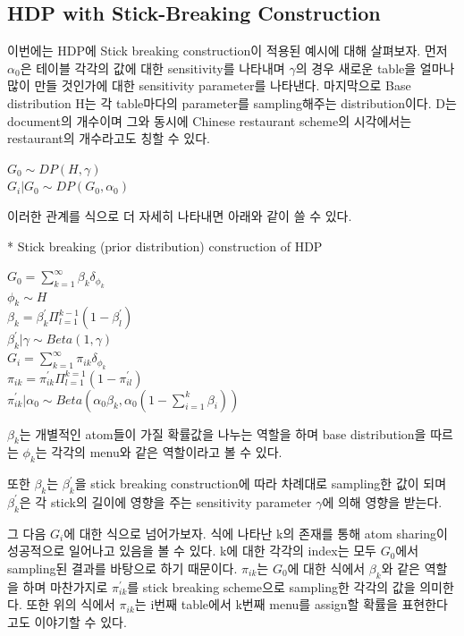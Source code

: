 \documentclass[a4paper]{oblivoir}
\begin{document}
\subsection{HDP with Stick-Breaking Construction}
이번에는 HDP에 Stick breaking construction이 적용된 예시에 대해 살펴보자. 먼저 $\alpha_{0}$은 테이블 각각의 값에 대한 sensitivity를 나타내며 $\gamma$의 경우 새로운 table을 얼마나 많이 만들 것인가에 대한 sensitivity parameter를 나타낸다. 마지막으로 Base distribution H는 각 table마다의 parameter를 sampling해주는 distribution이다. D는 document의 개수이며 그와 동시에 Chinese restaurant scheme의 시각에서는 restaurant의 개수라고도 칭할 수 있다. 
\begin{center}
    $G_{0} \sim DP(H,\gamma)$\\
    $G_{i}|G_{0} \sim DP(G_{0},\alpha_{0})$\\
\end{center}
이러한 관계를 식으로 더 자세히 나타내면 아래와 같이 쓸 수 있다.

* Stick breaking (prior distribution) construction of HDP
\begin{center}
    $G_{0} = \sum^{\infty}_{k=1}\beta_{k}\delta_{\phi_{k}}$\\
    $\phi_{k} \sim H $\\
    $\beta_{k} = \beta^{'}_{k}\Pi^{k-1}_{l=1}(1-\beta^{'}_{l})$\\
    $\beta^{'}_{k} | \gamma \sim Beta(1,\gamma)$\\
    $G_{i} = \sum^{\infty}_{k=1}\pi_{ik}\delta_{\phi_{k}}$\\
    $\pi_{ik} = \pi^{'}_{ik}\Pi^{k=1}_{l=1}(1-\pi^{'}_{il})$\\
    $\pi^{'}_{ik}|\alpha_{0} \sim Beta(\alpha_{0}\beta_{k},\alpha_{0}(1-\sum^{k}_{i=1}\beta_{i}))$
\end{center}
$\beta_{k}$는 개별적인 atom들이 가질 확률값을 나누는 역할을 하며 base distribution을 따르는 $\phi_{k}$는 각각의 menu와 같은 역할이라고 볼 수 있다. 

또한 $\beta_{k}$는 $\beta^{'}_{k}$을 stick breaking construction에 따라 차례대로 sampling한 값이 되며 $\beta^{'}_{k}$은 각 stick의 길이에 영향을 주는 sensitivity parameter $\gamma$에 의해 영향을 받는다. 

그 다음 $G_{i}$에 대한 식으로 넘어가보자. 식에 나타난 k의 존재를 통해 atom sharing이 성공적으로 일어나고 있음을 볼 수 있다. k에 대한 각각의 index는 모두 $G_{0}$에서 sampling된 결과를 바탕으로 하기 때문이다. $\pi_{ik}$는 $G_{0}$에 대한 식에서 $\beta_{k}$와 같은 역할을 하며 마찬가지로 $\pi^{'}_{ik}$를 stick breaking scheme으로 sampling한 각각의 값을 의미한다. 또한 위의 식에서 $\pi_{ik}$는 i번째 table에서 k번째 menu를 assign할 확률을 표현한다고도 이야기할 수 있다. 
\end{document}
